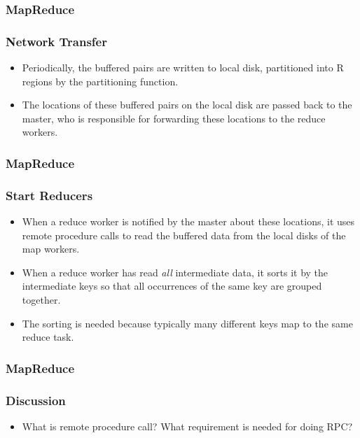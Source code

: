 \documentclass{beamer}
\begin{document}
\begin{frame}
\frametitle{MapReduce}
\centerline{}
\end{frame}

\begin{frame}
  \frametitle{Network Transfer}
  \begin{itemize}
    \item Periodically, the buffered pairs are written to local disk,
      partitioned into R regions by the partitioning function. 
    \item The locations of these buffered pairs on the local disk are
      passed back to the master, who is responsible for forwarding
      these locations to the reduce workers.
  \end{itemize}
\end{frame}

\begin{frame}
\frametitle{MapReduce}
\centerline{}
\end{frame}

\begin{frame}
  \frametitle{Start Reducers}
  \begin{itemize}
    \item When a reduce worker is notified by the master about these
      locations, it uses remote procedure calls to read the buffered
      data from the local disks of the map workers. 
    \item When a reduce worker has read {\em all} intermediate data,
      it sorts it by the intermediate keys so that all occurrences of
      the same key are grouped together.
    \item The sorting is needed because typically many different keys
      map to the same reduce task.
  \end{itemize}
\end{frame}

\begin{frame}
\frametitle{MapReduce}
\centerline{}
\end{frame}

\begin{frame}
  \frametitle{Discussion}
  \begin{itemize}
    \item What is remote procedure call?  What requirement is needed
      for doing RPC?
  \end{itemize}
\end{frame}
\end{document}
